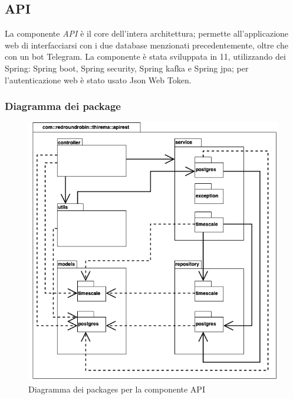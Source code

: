 \subsection{API}
	La componente \textit{API} è il core dell'intera architettura; permette all'applicazione web di interfacciarsi con i due database menzionati precedentemente, oltre che con un bot Telegram.
	\newline
	La componente è stata sviluppata in  11, utilizzando dei  Spring: Spring boot, Spring security, Spring kafka e Spring jpa; per l'autenticazione web è stato usato Json Web Token.

	\subsubsection{Diagramma dei package}%
		\begin{figure}[H]
			\centering
			\includegraphics[scale=0.500]{res/images/API/packageAPI.png}
			\caption{Diagramma dei packages per la componente API}
			\label{Diagramma 10}
		\end{figure}

